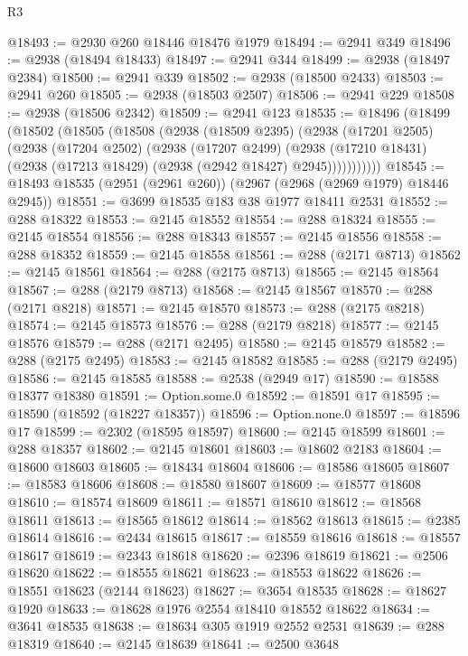 \begin{lexlean}{R3}
\begin{coremodule}
@18493 := @2930 @260 @18446 @18476 @1979
@18494 := @2941 @349
@18496 := @2938 (@18494 @18433)
@18497 := @2941 @344
@18499 := @2938 (@18497 @2384)
@18500 := @2941 @339
@18502 := @2938 (@18500 @2433)
@18503 := @2941 @260
@18505 := @2938 (@18503 @2507)
@18506 := @2941 @229
@18508 := @2938 (@18506 @2342)
@18509 := @2941 @123
@18535 := @18496
    (@18499
      (@18502
        (@18505
          (@18508
            (@2938
              (@18509 @2395)
              (@2938
                (@17201 @2505)
                (@2938
                  (@17204 @2502)
                  (@2938
                    (@17207 @2499)
                    (@2938
                      (@17210 @18431)
                      (@2938 (@17213 @18429) (@2938 (@2942 @18427) @2945)))))))))))
@18545 := @18493 @18535 (@2951 (@2961 @260)) (@2967 (@2968 (@2969 @1979) @18446 @2945))
@18551 := @3699 @18535 @183 @38 @1977 @18411 @2531
@18552 := @288 @18322
@18553 := @2145 @18552
@18554 := @288 @18324
@18555 := @2145 @18554
@18556 := @288 @18343
@18557 := @2145 @18556
@18558 := @288 @18352
@18559 := @2145 @18558
@18561 := @288 (@2171 @8713)
@18562 := @2145 @18561
@18564 := @288 (@2175 @8713)
@18565 := @2145 @18564
@18567 := @288 (@2179 @8713)
@18568 := @2145 @18567
@18570 := @288 (@2171 @8218)
@18571 := @2145 @18570
@18573 := @288 (@2175 @8218)
@18574 := @2145 @18573
@18576 := @288 (@2179 @8218)
@18577 := @2145 @18576
@18579 := @288 (@2171 @2495)
@18580 := @2145 @18579
@18582 := @288 (@2175 @2495)
@18583 := @2145 @18582
@18585 := @288 (@2179 @2495)
@18586 := @2145 @18585
@18588 := @2538 (@2949 @17)
@18590 := @18588 @18377 @18380
@18591 := Option.some.{0}
@18592 := @18591 @17
@18595 := @18590 (@18592 (@18227 @18357))
@18596 := Option.none.{0}
@18597 := @18596 @17
@18599 := @2302 (@18595 @18597)
@18600 := @2145 @18599
@18601 := @288 @18357
@18602 := @2145 @18601
@18603 := @18602 @2183
@18604 := @18600 @18603
@18605 := @18434 @18604
@18606 := @18586 @18605
@18607 := @18583 @18606
@18608 := @18580 @18607
@18609 := @18577 @18608
@18610 := @18574 @18609
@18611 := @18571 @18610
@18612 := @18568 @18611
@18613 := @18565 @18612
@18614 := @18562 @18613
@18615 := @2385 @18614
@18616 := @2434 @18615
@18617 := @18559 @18616
@18618 := @18557 @18617
@18619 := @2343 @18618
@18620 := @2396 @18619
@18621 := @2506 @18620
@18622 := @18555 @18621
@18623 := @18553 @18622
@18626 := @18551 @18623 (@2144 @18623)
@18627 := @3654 @18535
@18628 := @18627 @1920
@18633 := @18628 @1976 @2554 @18410 @18552 @18622
@18634 := @3641 @18535
@18638 := @18634 @305 @1919 @2552 @2531
@18639 := @288 @18319
@18640 := @2145 @18639
@18641 := @2500 @3648

\end{coremodule}
\end{lexlean}
